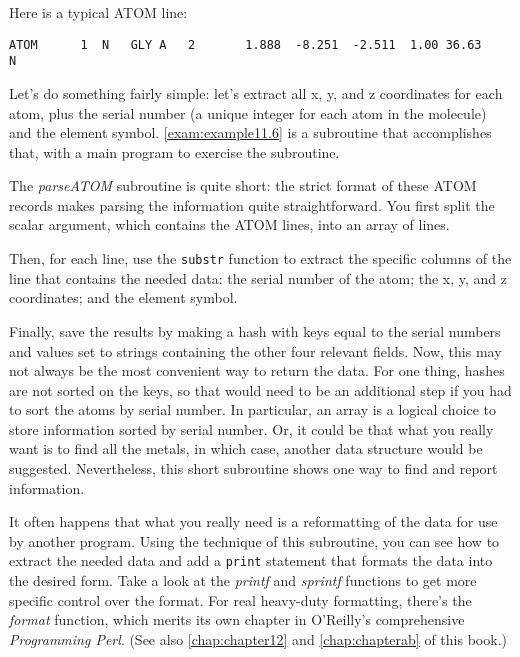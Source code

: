 Here is a typical ATOM line:

\begin{lstlisting}
ATOM      1  N   GLY A   2       1.888  -8.251  -2.511  1.00 36.63           N  
\end{lstlisting}

Let's do something fairly simple: let's extract all x, y, and z coordinates for each atom, plus the serial number (a unique integer for each atom in the molecule) and the element symbol. \autoref{exam:example11.6} is a subroutine that accomplishes that, with a main program to exercise the subroutine. 



The \textit{parseATOM} subroutine is quite short: the strict format of these ATOM records makes parsing the information quite straightforward. You first split the scalar argument, which contains the ATOM lines, into an array of lines.

Then, for each line, use the \verb|substr| function to extract the specific columns of the line that contains the needed data: the serial number of the atom; the x, y, and z coordinates; and the element symbol.

Finally, save the results by making a hash with keys equal to the serial numbers and values set to strings containing the other four relevant fields. Now, this may not always be the most convenient way to return the data. For one thing, hashes are not sorted on the keys, so that would need to be an additional step if you had to sort the atoms by serial number. In particular, an array is a logical choice to store information sorted by serial number. Or, it could be that what you really want is to find all the metals, in which case, another data structure would be suggested. Nevertheless, this short subroutine shows one way to find and report information.

It often happens that what you really need is a reformatting of the data for use by another program. Using the technique of this subroutine, you can see how to extract the needed data and add a \verb|print| statement that formats the data into the desired form. Take a look at the \textit{printf} and \textit{sprintf} functions to get more specific control over the format. For real heavy-duty formatting, there's the \textit{format} function, which merits its own chapter in O'Reilly's comprehensive \textit{Programming Perl}. (See also \autoref{chap:chapter12} and \autoref{chap:chapterab} of this book.)


